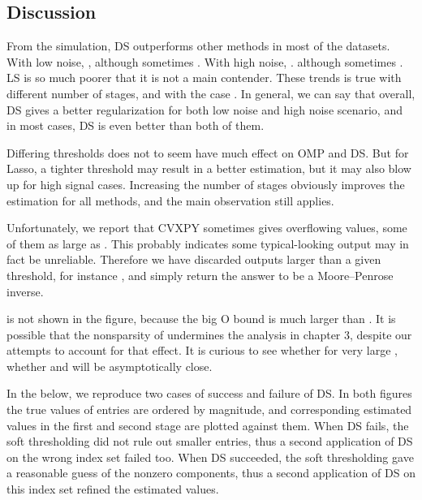 
\subsection {Discussion}

From the simulation, DS outperforms other methods in most of the datasets.
With low noise, ,
although sometimes .
With high noise, .
although sometimes .
LS is so much poorer that it is not a main contender.
These trends is true with different number of stages, and with the case .
In general, we can say that overall, DS gives a better regularization for both low noise and high noise scenario, and in most cases, DS is even better than both of them.

Differing thresholds does not to seem have much effect on OMP and DS.
But for Lasso, a tighter threshold may result in a better estimation, but it may also blow up for high signal cases.
Increasing the number of stages obviously improves the estimation for all methods, and the main observation still applies.

Unfortunately, we report that CVXPY sometimes gives overflowing values, some of them as large as .
This probably indicates some typical-looking output may in fact be unreliable.
Therefore we have discarded outputs larger than a given threshold, for instance , and simply return the answer to be a Moore–Penrose inverse.

\m {\chi} is not shown in the figure, because the big O bound is much larger than \m {\tilde {\chi}}.
It is possible that the nonsparsity of  undermines the analysis in chapter 3, despite our attempts to account for that effect.
It is curious to see whether for very large , whether \m {\tilde {\chi}} and \m {\chi} will be asymptotically close.

In the below, we reproduce two cases of success and failure of DS.
In both figures the true values of  entries are ordered by magnitude, and corresponding estimated values in the first and second stage are plotted against them.
When DS fails, the soft thresholding did not rule out smaller entries, thus a second application of DS on the wrong index set failed too.
When DS succeeded, the soft thresholding gave a reasonable guess of the nonzero components, thus a second application of DS on this index set refined the estimated values.


